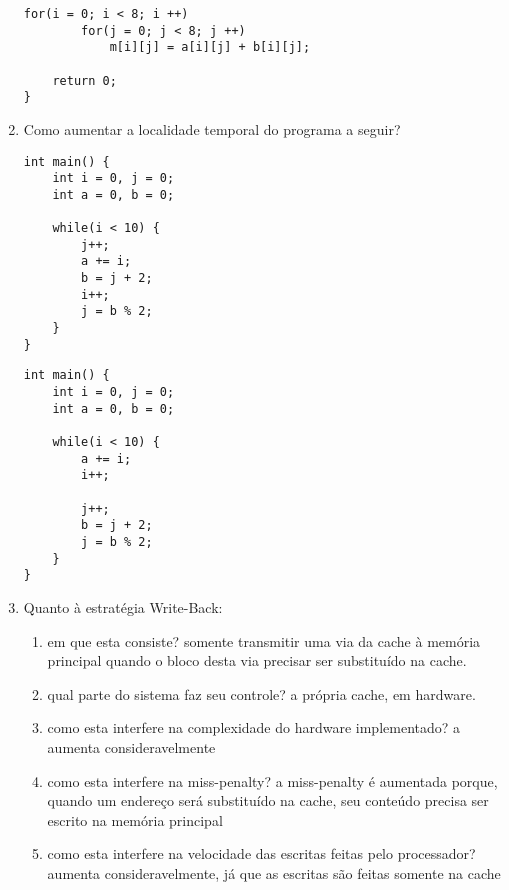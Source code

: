 \documentclass{article}
\begin{document}
\begin{enumerate}
\begin{center}
\begin{minipage}{0.575\textwidth}
\begin{lstlisting}[frame=single]
    for(i = 0; i < 8; i ++)
        for(j = 0; j < 8; j ++)
            m[i][j] = a[i][j] + b[i][j];
    
    return 0;
}
        \end{lstlisting}
    \end{minipage}
\end{center}

\item Como aumentar a localidade temporal do programa a seguir?

\begin{center}
    \begin{minipage}{0.35\textwidth}
        \begin{lstlisting}[frame=single]
int main() {
    int i = 0, j = 0;
    int a = 0, b = 0;
    
    while(i < 10) {
        j++;
        a += i;
        b = j + 2;
        i++;
        j = b % 2;
    }
}
        \end{lstlisting}
    \end{minipage}
\end{center}

\begin{center}
    \begin{minipage}{0.35\textwidth}
        \begin{lstlisting}[frame=single]
int main() {
    int i = 0, j = 0;
    int a = 0, b = 0;
    
    while(i < 10) {
        a += i;
        i++;
        
        j++;
        b = j + 2;
        j = b % 2;
    }
}
        \end{lstlisting}
    \end{minipage}
\end{center}

\item Quanto à estratégia Write-Back:
\begin{enumerate}
    \item em que esta consiste? somente transmitir uma via da cache à memória principal quando o bloco desta via precisar ser substituído na cache.
    \item qual parte do sistema faz seu controle? a própria cache, em hardware.
    \item como esta interfere na complexidade do hardware implementado? a aumenta consideravelmente
    \item como esta interfere na miss-penalty? a miss-penalty é aumentada porque, quando um endereço será substituído na cache, seu conteúdo precisa ser escrito na memória principal
    \item como esta interfere na velocidade das escritas feitas pelo processador? aumenta consideravelmente, já que as escritas são feitas somente na cache
\end{enumerate}


\end{enumerate}
\end{document}
